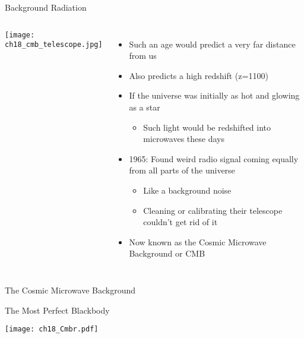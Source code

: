 \documentclass[pdf,aspectratio=169]{beamer}
\begin{document}
\begin{frame}{Background Radiation}
  \begin{columns}
	\begin{center}
	  \texttt{[image: ch18\_cmb\_telescope.jpg]}
	\end{center}
	\begin{itemize}
	  \item Such an age would predict a very far distance from us
	  \item Also predicts a high redshift (z=1100)
	  \item If the universe was initially as hot and glowing as a star
		\begin{itemize}
		  \item Such light would be redshifted into microwaves these days
		\end{itemize}
	  \item 1965: Found weird radio signal coming equally from all parts of the universe
		\begin{itemize}
		  \item Like a background noise
		  \item Cleaning or calibrating their telescope couldn't get rid of it
		\end{itemize}
	  \item Now known as the \alert{Cosmic Microwave Background} or CMB
	\end{itemize}
  \end{columns}
\end{frame}

\begin{frame}{The Cosmic Microwave Background}
  \begin{center}
  \end{center}
\end{frame}

\begin{frame}{The Most Perfect Blackbody}
  \begin{center}
	\texttt{[image: ch18\_Cmbr.pdf]}
  \end{center}
\end{frame}
\end{document}
